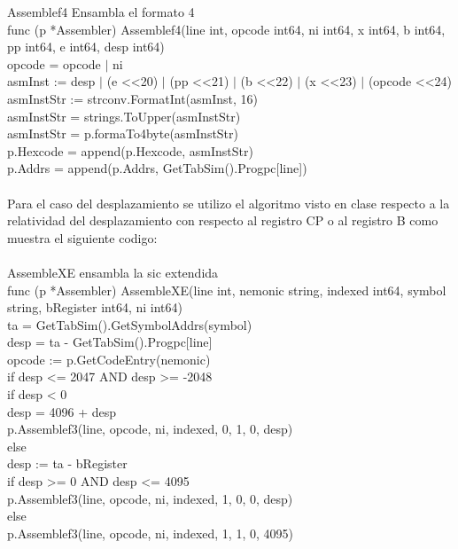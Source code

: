\documentclass[10pt,letterpaper,oneside]{article}
\begin{document}
Assemblef4 Ensambla el formato 4\\
func (p *Assembler) Assemblef4(line int, opcode int64, ni int64, x int64, b int64, pp int64, e int64, desp int64) \\
	opcode = opcode $|$ ni\\
	asmInst := desp $|$ (e \textless\textless 20) $|$ (pp \textless\textless 21) $|$ (b \textless\textless 22) $|$ (x \textless\textless 23) $|$ (opcode \textless\textless 24)\\
	asmInstStr := strconv.FormatInt(asmInst, 16)\\
	asmInstStr = strings.ToUpper(asmInstStr)\\
	asmInstStr = p.formaTo4byte(asmInstStr)\\
	p.Hexcode = append(p.Hexcode, asmInstStr)\\
	p.Addrs = append(p.Addrs, GetTabSim().Progpc[line])\\
\\
Para el caso del desplazamiento se utilizo el algoritmo visto en clase respecto a la relatividad del desplazamiento con respecto al registro CP o al registro B como muestra el siguiente codigo: \\
\\
AssembleXE ensambla la sic extendida\\
func (p *Assembler) AssembleXE(line int, nemonic string, indexed int64, symbol string, bRegister int64, ni int64)  \\
	ta = GetTabSim().GetSymbolAddrs(symbol)\\
	desp = ta - GetTabSim().Progpc[line]\\
	opcode := p.GetCodeEntry(nemonic)\\
	if desp \textless= 2047 AND desp \textgreater= -2048\\ 
		if desp < 0  \\
			desp = 4096 + desp\\
		p.Assemblef3(line, opcode, ni, indexed, 0, 1, 0, desp)\\
	 else \\
		desp := ta - bRegister\\
		if desp \textgreater= 0 AND desp \textless= 4095 \\
			p.Assemblef3(line, opcode, ni, indexed, 1, 0, 0, desp)\\
		 else  \\
			p.Assemblef3(line, opcode, ni, indexed, 1, 1, 0, 4095)\\
		
	
\end{document}
